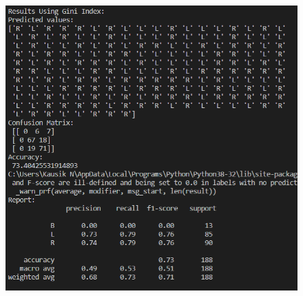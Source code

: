 \documentclass[12pt]{article}
\renewcommand{\_}{\kern-1.5pt\textunderscore\kern-1.5pt}
\begin{document}
\begin{figure}[H]
	\begin{Center}
		\includegraphics[width=6.5in,height=5.13in]{./media/image14.png}
	\end{Center}
\end{figure}



\par



\end{document}
